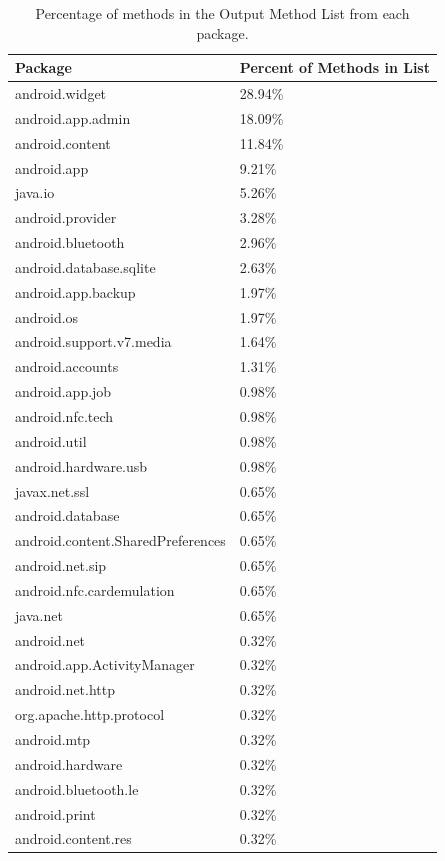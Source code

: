 \documentclass{sig-alternate}
\begin{document}
\begin{table}
\centering

\label{tab:output_method_percent}

\begin{tabular}{|l|l|}
\hline
\textbf{Package} & \textbf{Percent of Methods in List} \\ 
\hline

android.widget & 28.94\% \\ 
android.app.admin & 18.09\% \\ 
android.content & 11.84\% \\ 
android.app & 9.21\% \\ 
java.io & 5.26\% \\ 
android.provider & 3.28\% \\ 
android.bluetooth & 2.96\% \\ 
android.database.sqlite & 2.63\% \\ 
android.app.backup & 1.97\% \\ 
android.os & 1.97\% \\ 
android.support.v7.media & 1.64\% \\ 
android.accounts & 1.31\% \\ 
android.app.job & 0.98\% \\ 
android.nfc.tech & 0.98\% \\ 
android.util & 0.98\% \\ 
android.hardware.usb & 0.98\% \\ 
javax.net.ssl & 0.65\% \\ 
android.database & 0.65\% \\ 
android.content.SharedPreferences & 0.65\% \\ 
android.net.sip & 0.65\% \\ 
android.nfc.cardemulation & 0.65\% \\ 
java.net & 0.65\% \\ 
android.net & 0.32\% \\ 
android.app.ActivityManager & 0.32\% \\ 
android.net.http & 0.32\% \\ 
org.apache.http.protocol & 0.32\% \\ 
android.mtp & 0.32\% \\ 
android.hardware & 0.32\% \\ 
android.bluetooth.le & 0.32\% \\ 
android.print & 0.32\% \\ 
android.content.res & 0.32\% \\

\hline
\end{tabular}

\caption{Percentage of methods in the Output Method List from each package.}

\end{table}

\end{document}
